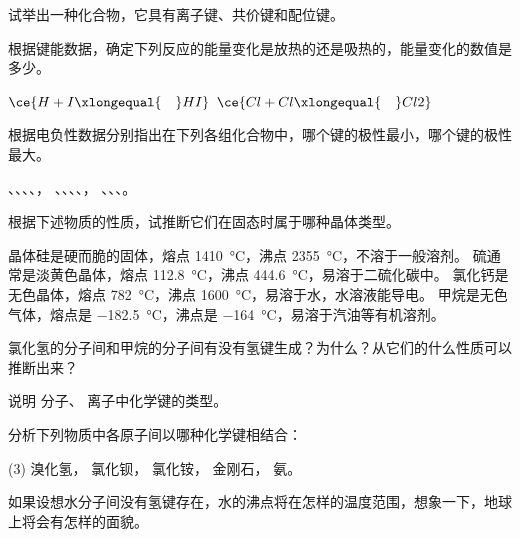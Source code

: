 \begin{Review}
\begin{question}
  \item 试举出一种化合物，它具有离子键、共价键和配位键。
  \item 根据键能数据，确定下列反应的能量变化是放热的还是吸热的，能量变化的数值是多少。
  \begin{tasks}
    \task $\ce{H + I \xlongequal{\quad} HI}$
    \task $\ce{Cl + Cl \xlongequal{\quad} Cl2}$
  \end{tasks}
  \item 根据电负性数据分别指出在下列各组化合物中，哪个键的极性最小，哪个键的极性最大。
  \begin{tasks}
    \task {}、、、、，
    \task {}、、、、，
    \task {}、、、。
  \end{tasks}
  \item 根据下述物质的性质，试推断它们在固态时属于哪种晶体类型。
  \begin{tasks}
    \task 晶体硅是硬而脆的固体，熔点 \qty{1410}{\celsius}，沸点 \qty{2355}{\celsius}，不溶于一般溶剂。
    \task 硫通常是淡黄色晶体，熔点 \qty{112.8}{\celsius}，沸点 \qty{444.6}{\celsius}，易溶于二硫化碳中。
    \task 氯化钙是无色晶体，熔点 \qty{782}{\celsius}，沸点 \qty{1600}{\celsius}，易溶于水，水溶液能导电。
    \task 甲烷是无色气体，熔点是 \qty{-182.5}{\celsius}，沸点是 \qty{-164}{\celsius}，易溶于汽油等有机溶剂。
  \end{tasks}
  \item 氯化氢的分子间和甲烷的分子间有没有氢键生成？为什么？从它们的什么性质可以推断出来？
  \item 说明  分子、 离子中化学键的类型。
  \item 分析下列物质中各原子间以哪种化学键相结合：
  \begin{tasks}(3)
    \task 溴化氢，
    \task 氯化钡，
    \task 氯化铵，
    \task 金刚石，
    \task 氨。
  \end{tasks}
  \item 如果设想水分子间没有氢键存在，水的沸点将在怎样的温度范围，想象一下，地球上将会有怎样的面貌。
\end{question}
\end{Review}